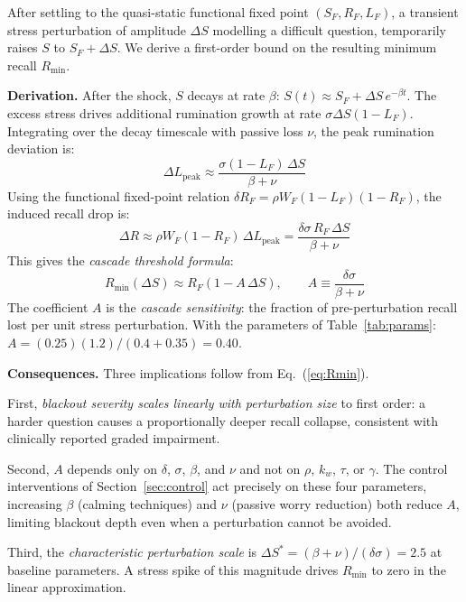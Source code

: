 After settling to the quasi-static functional fixed point
$(S_F, R_F, L_F)$, a transient stress perturbation of amplitude
$\Delta S$ modelling a difficult question, temporarily raises
$S$ to $S_F+\Delta S$. We derive a first-order bound on the
resulting minimum recall $R_{\min}$.

\medskip\noindent\textbf{Derivation.}
After the shock, $S$ decays at rate $\beta$:
$S(t)\approx S_F + \Delta S\,e^{-\beta t}$.
The excess stress drives additional rumination growth at rate
$\sigma\Delta S(1-L_F)$. Integrating over the decay timescale
with passive loss $\nu$, the peak rumination deviation is:
\begin{equation}
  \Delta L_{\mathrm{peak}} \approx
  \frac{\sigma(1-L_F)\,\Delta S}{\beta + \nu}
  \label{eq:DL}
\end{equation}
Using the functional fixed-point relation
$\delta R_F = \rho W_F(1-L_F)(1-R_F)$, the induced recall drop is:
\begin{equation}
  \Delta R \approx \rho W_F(1-R_F)\,\Delta L_{\mathrm{peak}}
  = \frac{\delta\sigma\,R_F\,\Delta S}{\beta+\nu}
  \label{eq:DR}
\end{equation}
This gives the \emph{cascade threshold formula}:
\begin{equation}
  \boxed{R_{\min}(\Delta S) \approx R_F\!\left(1 - A\,\Delta S\right),
  \qquad A \equiv \frac{\delta\sigma}{\beta + \nu}}
  \label{eq:Rmin}
\end{equation}
The coefficient $A$ is the \emph{cascade sensitivity}: the fraction
of pre-perturbation recall lost per unit stress perturbation. With
the parameters of Table~\ref{tab:params}:
$A = (0.25)(1.2)/(0.4+0.35) = 0.40$.

\medskip\noindent\textbf{Consequences.}
Three implications follow from Eq.~(\ref{eq:Rmin}).

First, \emph{blackout severity scales linearly with perturbation
size} to first order: a harder question causes a proportionally
deeper recall collapse, consistent with clinically reported graded
impairment.

Second, $A$ depends only on $\delta$, $\sigma$, $\beta$, and
$\nu$ and not on $\rho$, $k_w$, $\tau$, or $\gamma$. The control
interventions of Section~\ref{sec:control} act precisely on these
four parameters, increasing $\beta$ (calming techniques) and $\nu$
(passive worry reduction) both reduce $A$, limiting blackout depth
even when a perturbation cannot be avoided.

Third, the \emph{characteristic perturbation scale} is
$\Delta S^* = (\beta+\nu)/(\delta\sigma) = 2.5$ at baseline
parameters. A stress spike of this magnitude drives $R_{\min}$ to
zero in the linear approximation.

